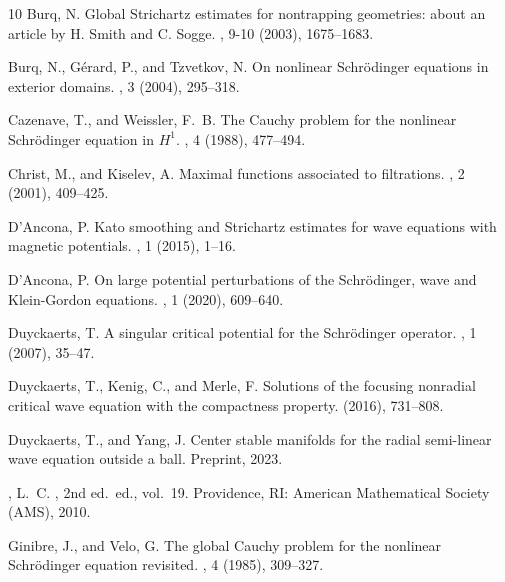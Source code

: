 \documentclass[10pt,leqno]{amsart}
\theoremstyle{definition}%
\theoremstyle{remark}
\numberwithin{equation}{section}
\renewcommand{\^}{\widehat}%
\begin{document}
\begin{thebibliography}{10}
{\sc Burq, N.}
\newblock Global {S}trichartz estimates for nontrapping geometries: about an
  article by {H}. {S}mith and {C}. {S}ogge.
, 9-10 (2003),
  1675--1683.

{\sc Burq, N., G{\'e}rard, P., and Tzvetkov, N.}
\newblock On nonlinear {S}chr\"odinger equations in exterior domains.
, 3 (2004),
  295--318.

{\sc Cazenave, T., and Weissler, F.~B.}
\newblock The {Cauchy} problem for the nonlinear {Schr{\"o}dinger} equation in
  {{\(H^ 1\)}}.
, 4 (1988), 477--494.

{\sc Christ, M., and Kiselev, A.}
\newblock Maximal functions associated to filtrations.
, 2 (2001), 409--425.

{\sc D'Ancona, P.}
\newblock Kato smoothing and {Strichartz} estimates for wave equations with
  magnetic potentials.
, 1 (2015), 1--16.

{\sc D'Ancona, P.}
\newblock On large potential perturbations of the {Schr{\"o}dinger}, wave and
  {Klein}-{Gordon} equations.
, 1 (2020), 609--640.

{\sc Duyckaerts, T.}
\newblock A singular critical potential for the {S}chr\"odinger operator.
, 1 (2007), 35--47.

{\sc Duyckaerts, T., Kenig, C., and Merle, F.}
\newblock Solutions of the focusing nonradial critical wave equation with the
  compactness property.
 (2016), 731--808.

{\sc Duyckaerts, T., and Yang, J.}
\newblock Center stable manifolds for the radial semi-linear wave equation
  outside a ball.
\newblock Preprint, 2023.

{, L.~C.}
, 2nd ed.~ed., vol.~19.
\newblock Providence, RI: American Mathematical Society (AMS), 2010.

{\sc Ginibre, J., and Velo, G.}
\newblock The global {C}auchy problem for the nonlinear {S}chr\"odinger
  equation revisited.
, 4 (1985),
  309--327.


\end{thebibliography}
\end{document}
